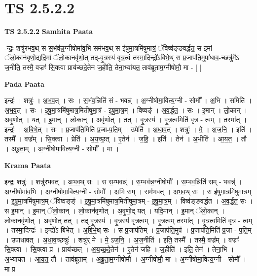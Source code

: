 \documentclass[17pt]{extarticle}
\begin{document}
\section{ TS 2.5.2.2 }

\textbf{TS 2.5.2.2 } \newline
\textbf{Samhita Paata} \newline

-न्द्रः॒ शत्रु॑रभव॒थ् स स॒भंव॑न्न॒ग्नीषोमा॑व॒भि सम॑भव॒थ् स इ॑षुमा॒त्रमि॑षुमात्रं॒ ॅविष्व॑ङ्ङवर्द्धत॒ स इ॒मां ॅलो॒कान॑वृणो॒द्यदि॒मां ॅलो॒कानवृ॑णो॒त् तद्-वृ॒त्रस्य॑ वृत्र॒त्वं तस्मा॒दिन्द्रो॑ऽबिभे॒थ् स प्र॒जाप॑ति॒मुपा॑धाव॒-च्छत्रु॑र्मेऽ ज॒नीति॒ तस्मै॒ वज्रꣳ॑ सि॒क्त्वा प्राय॑च्छदे॒तेन॑ ज॒हीति॒ तेना॒भ्या॑यत॒ ताव॑ब्रूताम॒ग्नीषोमौ॒ मा - [  ] \newline

\textbf{Pada Paata} \newline

इन्द्रः॑ । शत्रुः॑ । अ॒भ॒व॒त् । सः । स॒भंव॒न्निति॑ सं - भवन्न्॑ । अ॒ग्नीषोमा॒वित्य॒ग्नी - सोमौ᳚ । अ॒भि । समिति॑ । अ॒भ॒व॒त् । सः । इ॒षु॒मा॒त्रमि॑षुमात्र॒मिती॑षुमा॒त्रं - इ॒षु॒मा॒त्र॒म् । विष्वङ्॑ । अ॒व॒र्द्ध॒त॒ । सः । इ॒मान् । लो॒कान् । अ॒वृ॒णो॒त् । यत् । इ॒मान् । लो॒कान् । अवृ॑णोत् । तत् । वृ॒त्रस्य॑ । वृ॒त्र॒त्वमिति॑ वृत्र - त्वम् । तस्मा᳚त् । इन्द्रः॑ । अ॒बि॒भे॒त् । सः । प्र॒जाप॑ति॒मिति॑ प्र॒जा-प॒ति॒म् । उपेति॑ । अ॒धा॒व॒त् । शत्रुः॑ । मे॒ । अ॒ज॒नि॒ । इति॑ । तस्मै᳚ । वज्र᳚म् । सि॒क्त्वा । प्रेति॑ । अ॒य॒च्छ॒त् । ए॒तेन॑ । ज॒हि॒ । इति॑ । तेन॑ । अ॒भीति॑ । आ॒य॒त॒ । तौ । अ॒ब्रू॒ता॒म् । अ॒ग्नीषोमा॒वित्य॒ग्नी - सोमौ᳚ । मा ।  \newline


\textbf{Krama Paata} \newline

इन्द्रः॒ शत्रुः॑ । शत्रु॑रभवत् । अ॒भ॒व॒थ् सः । स स॒म्भवन्न्॑ । स॒म्भव॑न्न॒ग्नीषोमौ᳚ । स॒म्भव॒न्निति॑ सम् - भवन्न्॑ । अ॒ग्नीषोमा॑व॒भि । अ॒ग्नीषोमा॒वित्य॒ग्नी - सोमौ᳚ । अ॒भि सम् । सम॑भवत् । अ॒भ॒व॒थ् सः । स इ॑षुमा॒त्रमि॑षुमात्रम् । इ॒षु॒मा॒त्रमि॑षुमात्र॒म् ॅविष्वङ्ङ्॑ । इ॒षु॒मा॒त्रमि॑षुमात्र॒मिती॑षुमा॒त्रम् - इ॒षु॒मा॒त्र॒म् । विष्व॑ङ्ङवर्द्धत । अ॒व॒र्द्ध॒त॒ सः । स इ॒मान् । इ॒मान् ॅलो॒कान् । लो॒कान॑वृणोत् । अ॒वृ॒णो॒द् यत् । यदि॒मान् । इ॒मान् ॅलो॒कान् । लो॒कानवृ॑णोत् । अवृ॑णो॒त् तत् । तद् वृ॒त्रस्य॑ । वृ॒त्रस्य॑ वृत्र॒त्वम् । वृ॒त्र॒त्वम् तस्मा᳚त् । वृ॒त्र॒त्वमिति॑ वृत्र - त्वम् । तस्मा॒दिन्द्रः॑ । इन्द्रो॑ऽ बिभेत् । अ॒बि॒भे॒थ् सः । स प्र॒जाप॑तिम् । प्र॒जाप॑ति॒मुप॑ । प्र॒जाप॑ति॒मिति॑ प्र॒जा - प॒ति॒म् । उपा॑धावत् । अ॒धा॒व॒च्छत्रुः॑ । शत्रु॑र् मे । मे॒ ऽज॒नि॒ । अ॒ज॒नीति॑ । इति॒ तस्मै᳚ । तस्मै॒ वज्र᳚म् । वज्रꣳ॑ सि॒क्त्वा । सि॒क्त्वा प्र । प्राय॑च्छत् । अ॒य॒च्छ॒दे॒तेन॑ । ए॒तेन॑ जहि । ज॒हीति॑ । इति॒ तेन॑ । तेना॒भि । अ॒भ्या॑यत । आ॒य॒त॒ तौ । ताव॑ब्रूताम् । अ॒ब्रू॒ता॒म॒ग्नीषोमौ᳚ । अ॒ग्नीषोमौ॒ मा । अ॒ग्नीषोमा॒वित्य॒ग्नी - सोमौ᳚ । मा प्र \newline
\end{document}
